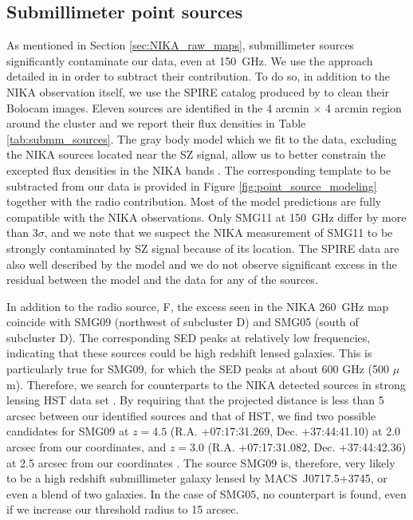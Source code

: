 \documentclass[twocolumn,traditabstract]{aa}
\begin{document}
\subsection{Submillimeter point sources}\label{sec:Submillimeter_point_sources}
As mentioned in Section \ref{sec:NIKA_raw_maps}, submillimeter sources significantly contaminate our data, even at 150~GHz. We use the approach detailed in \cite{Adam2016} in order to subtract their contribution. To do so, in addition to the NIKA observation itself, we use the SPIRE \citep[Spectral and Photometric Imaging REceiver,][]{Griffin2010} catalog produced by \cite{Sayers2013} to clean their Bolocam images. Eleven sources are identified in the 4 arcmin $\times$ 4 arcmin region around the cluster and we report their flux densities in Table \ref{tab:submm_sources}. The gray body model which we fit to the data, excluding the NIKA sources located near the SZ signal, allow us to better constrain the excepted flux densities in the NIKA bands \citep[see][for more details]{Adam2016}. The corresponding template to be subtracted from our data is provided in Figure \ref{fig:point_source_modeling} together with the radio contribution. Most of the model predictions are fully compatible with the NIKA observations. Only SMG11 at 150~GHz differ by more than $3 \sigma$, and we note that we suspect the NIKA measurement of SMG11 to be strongly contaminated by SZ signal because of its location. The SPIRE data are also well described by the model and we do not observe significant excess in the residual between the model and the data for any of the sources.

In addition to the radio source, F, the excess seen in the NIKA 260~GHz map coincide with SMG09 (northwest of subcluster D) and SMG05 (south of subcluster D). The corresponding SED peaks at relatively low frequencies, indicating that these sources could be high redshift lensed galaxies. This is particularly true for SMG09, for which the SED peaks at about 600 GHz (500 $\mu$m). Therefore, we search for counterparts to the NIKA detected sources in strong lensing HST data set \citep[Hubble Space Telecope, Frontier Field campaign, see][]{Diego2015}. By requiring that the projected distance is less than 5 arcsec between our identified sources and that of HST, we find two possible candidates for SMG09 at $z=4.5$ (R.A. +07:17:31.269, Dec. +37:44:41.10) at 2.0 arcsec from our coordinates, and $z=3.0$ (R.A. +07:17:31.082, Dec. +37:44:42.36) at 2.5 arcsec from our coordinates \citep[ID25.1 and ID62.1, respectively,][]{Diego2015}. The source SMG09 is, therefore, very likely to be a high redshift submillimeter galaxy lensed by \mbox{MACS~J0717.5+3745}, or even a blend of two galaxies. In the case of SMG05, no counterpart is found, even if we increase our threshold radius to 15 arcsec.
\end{document}
